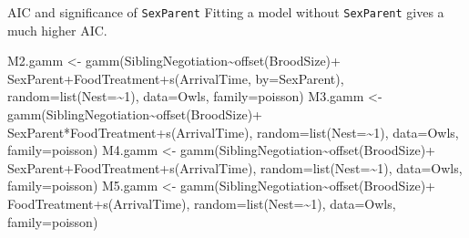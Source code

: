 \documentclass[
  ignorenonframetext,
]{beamer}
\newenvironment{Shaded}{\begin{snugshade}}{\end{snugshade}}
\newcommand{\AttributeTok}[1]{\textcolor[rgb]{0.77,0.63,0.00}{#1}}
\newcommand{\DecValTok}[1]{\textcolor[rgb]{0.00,0.00,0.81}{#1}}
\newcommand{\FunctionTok}[1]{\textcolor[rgb]{0.00,0.00,0.00}{#1}}
\newcommand{\NormalTok}[1]{#1}
\newcommand{\OtherTok}[1]{\textcolor[rgb]{0.56,0.35,0.01}{#1}}
\newcommand{\SpecialCharTok}[1]{\textcolor[rgb]{0.00,0.00,0.00}{#1}}
\begin{document}
\begin{frame}[fragile]{AIC and significance of \texttt{SexParent}}
\protect\hypertarget{aic-and-significance-of-sexparent}{}
Fitting a model without \texttt{SexParent} gives a much higher AIC.

\scriptsize

\begin{Shaded}
\begin{Highlighting}[]
\NormalTok{M2.gamm }\OtherTok{\textless{}{-}} \FunctionTok{gamm}\NormalTok{(SiblingNegotiation}\SpecialCharTok{\textasciitilde{}}\FunctionTok{offset}\NormalTok{(BroodSize)}\SpecialCharTok{+}
\NormalTok{                SexParent}\SpecialCharTok{+}\NormalTok{FoodTreatment}\SpecialCharTok{+}\FunctionTok{s}\NormalTok{(ArrivalTime, }\AttributeTok{by=}\NormalTok{SexParent),}
                \AttributeTok{random=}\FunctionTok{list}\NormalTok{(}\AttributeTok{Nest=}\SpecialCharTok{\textasciitilde{}}\DecValTok{1}\NormalTok{), }\AttributeTok{data=}\NormalTok{Owls, }\AttributeTok{family=}\NormalTok{poisson)}
\NormalTok{M3.gamm }\OtherTok{\textless{}{-}} \FunctionTok{gamm}\NormalTok{(SiblingNegotiation}\SpecialCharTok{\textasciitilde{}}\FunctionTok{offset}\NormalTok{(BroodSize)}\SpecialCharTok{+}
\NormalTok{                SexParent}\SpecialCharTok{*}\NormalTok{FoodTreatment}\SpecialCharTok{+}\FunctionTok{s}\NormalTok{(ArrivalTime),}
                \AttributeTok{random=}\FunctionTok{list}\NormalTok{(}\AttributeTok{Nest=}\SpecialCharTok{\textasciitilde{}}\DecValTok{1}\NormalTok{), }\AttributeTok{data=}\NormalTok{Owls, }\AttributeTok{family=}\NormalTok{poisson)}
\NormalTok{M4.gamm }\OtherTok{\textless{}{-}} \FunctionTok{gamm}\NormalTok{(SiblingNegotiation}\SpecialCharTok{\textasciitilde{}}\FunctionTok{offset}\NormalTok{(BroodSize)}\SpecialCharTok{+}
\NormalTok{                SexParent}\SpecialCharTok{+}\NormalTok{FoodTreatment}\SpecialCharTok{+}\FunctionTok{s}\NormalTok{(ArrivalTime),}
                \AttributeTok{random=}\FunctionTok{list}\NormalTok{(}\AttributeTok{Nest=}\SpecialCharTok{\textasciitilde{}}\DecValTok{1}\NormalTok{), }\AttributeTok{data=}\NormalTok{Owls, }\AttributeTok{family=}\NormalTok{poisson)}
\NormalTok{M5.gamm }\OtherTok{\textless{}{-}} \FunctionTok{gamm}\NormalTok{(SiblingNegotiation}\SpecialCharTok{\textasciitilde{}}\FunctionTok{offset}\NormalTok{(BroodSize)}\SpecialCharTok{+}
\NormalTok{                FoodTreatment}\SpecialCharTok{+}\FunctionTok{s}\NormalTok{(ArrivalTime),}
                \AttributeTok{random=}\FunctionTok{list}\NormalTok{(}\AttributeTok{Nest=}\SpecialCharTok{\textasciitilde{}}\DecValTok{1}\NormalTok{), }\AttributeTok{data=}\NormalTok{Owls, }\AttributeTok{family=}\NormalTok{poisson)}
\end{Highlighting}
\end{Shaded}


\end{frame}
\end{document}

